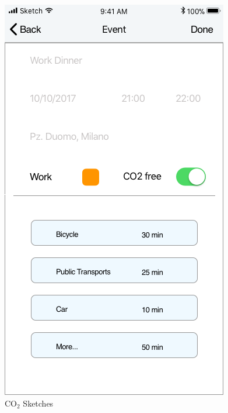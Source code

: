 \begin{figure}[H]
	\includegraphics[scale=0.23]{Images/Interface/CO2/2_CO2_enabled}
	\caption{CO$_2$ Sketches}
\end{figure}

